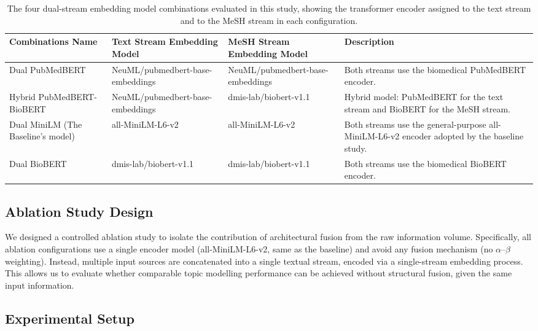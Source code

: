 \documentclass[authorproof,JACIII,researchpaper]{fujipressarticle}
\begin{document}
\begin{table}[!ht]
\caption{The four dual-stream embedding model combinations evaluated in this study, showing the transformer encoder assigned to the text stream and to the MeSH stream in each configuration.}
\label{tab:model_combinations}
\centering
\renewcommand{\arraystretch}{1.3}
\begin{tabular}{p{3.2cm}p{4.2cm}p{4cm}p{4.8cm}}
\hline
\textbf{Combinations Name} & \textbf{Text Stream Embedding Model} & \textbf{MeSH Stream Embedding Model} & \textbf{Description} \\
\hline
Dual PubMedBERT & NeuML/pubmedbert-base-embeddings & NeuML/pubmedbert-base-embeddings & Both streams use the biomedical PubMedBERT encoder. \\
\hline
Hybrid PubMedBERT-BioBERT & NeuML/pubmedbert-base-embeddings & dmis-lab/biobert-v1.1 & Hybrid model: PubMedBERT for the text stream and BioBERT for the MeSH stream. \\
\hline
Dual MiniLM (The Baseline's model) & all-MiniLM-L6-v2 & all-MiniLM-L6-v2 & Both streams use the general-purpose all-MiniLM-L6-v2 encoder adopted by the baseline study. \\
\hline
Dual BioBERT & dmis-lab/biobert-v1.1 & dmis-lab/biobert-v1.1 & Both streams use the biomedical BioBERT encoder. \\
\hline
\end{tabular}
\end{table}

\subsection{Ablation Study Design}

We designed a controlled ablation study to isolate the contribution of architectural fusion from the raw information volume. Specifically, all ablation configurations use a single encoder model (all-MiniLM-L6-v2, same as the baseline) and avoid any fusion mechanism (no $\alpha$--$\beta$ weighting). Instead, multiple input sources are concatenated into a single textual stream, encoded via a single-stream embedding process. This allows us to evaluate whether comparable topic modelling performance can be achieved without structural fusion, given the same input information.

\subsection{Experimental Setup}
\end{document}
